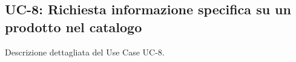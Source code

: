 \subsection{UC-8: Richiesta informazione specifica su un prodotto nel catalogo}

Descrizione dettagliata del Use Case UC-8.
